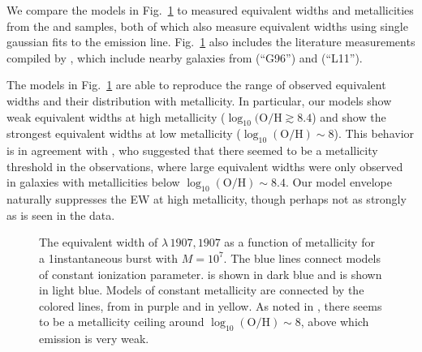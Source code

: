 We compare the models in Fig.~\ref{fig:CIIIew} to measured equivalent widths and metallicities from the \citet{Berg+2016} and \citet{Senchyna+2017} samples, both of which also measure equivalent widths using single gaussian fits to the emission line. Fig.~\ref{fig:CIIIew} also includes the literature measurements compiled by \citet{Senchyna+2017}, which include nearby galaxies from \citet{Giavalisco+1996} (``G96'') and \citet{Leitherer+2011} (``L11'').

The models in Fig.~\ref{fig:CIIIew} are able to reproduce the range of observed \ciii equivalent widths and their distribution with metallicity. In particular, our models show weak \ciii equivalent widths at high metallicity ($\log_{10}(\mathrm{O}/\mathrm{H} \gtrsim 8.4$) and show the strongest \ciii equivalent widths at low metallicity ($\log_{10}(\mathrm{O}/\mathrm{H}){\sim} 8$). This behavior is in agreement with \citet{Senchyna+2017}, who suggested that there seemed to be a metallicity threshold in the observations, where large \ciii equivalent widths were only observed in galaxies with metallicities below $\log_{10}(\mathrm{O}/\mathrm{H})\sim 8.4$. Our model envelope naturally suppresses the \ciii EW at high metallicity, though perhaps not as strongly as is seen in the data.


\begin{figure}
  \begin{center}
    \caption{The equivalent width of \ciii$\lambda\,1907,1907$ as a function of metallicity for a 1\Myr instantaneous burst with $M=10^7$\Msun. The blue lines connect models of constant ionization parameter.  is shown in dark blue and  is shown in light blue. Models of constant metallicity are connected by the colored lines, from  in purple and  in yellow. As noted in \citet{Senchyna+2017}, there seems to be a metallicity ceiling around $\log_{10}(\mathrm{O}/\mathrm{H})\sim 8$, above which \ciii emission is very weak. }
    \label{fig:CIIIew}
  \end{center}
\end{figure}


